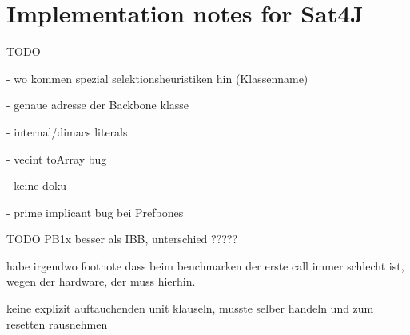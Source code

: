 \section{Implementation notes for Sat4J}
TODO

- wo kommen spezial selektionsheuristiken hin (Klassenname)

- genaue adresse der Backbone klasse

- internal/dimacs literals

- vecint toArray bug

- keine doku

- prime implicant bug bei Prefbones

TODO PB1x besser als IBB, unterschied ?????

habe irgendwo footnote dass beim benchmarken der erste call immer schlecht ist, wegen der hardware, der muss hierhin.

keine explizit auftauchenden unit klauseln, musste selber handeln und zum resetten rausnehmen